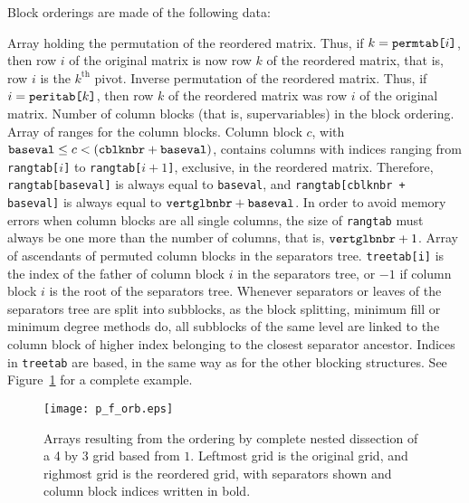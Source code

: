 Block orderings are made of the following data:
\begin{itemize}
\iteme[{\tt permtab}]
Array holding the permutation of the reordered matrix. Thus, if $k =
\mbox{\tt permtab}\mbox{\tt [}i\mbox{\tt ]}$, then row $i$ of the
original matrix is now row $k$ of the reordered matrix, that is, row
$i$ is the $k^{\mbox{th}}$ pivot.
\iteme[{\tt peritab}]
Inverse permutation of the reordered matrix. Thus, if $i = \mbox{\tt
peritab[$k$]}$, then row $k$ of the reordered matrix was row $i$ of
the original matrix.
\iteme[{\tt cblknbr}]
Number of column blocks (that is, supervariables) in the block ordering.
\iteme[{\tt rangtab}]
Array of ranges for the column blocks. Column block $c$, with
$\mbox{\tt baseval} \leq c < (\mbox{\tt cblknbr} + \mbox{\tt
baseval})$, contains columns with indices ranging from {\tt
rangtab[$i$]} to {\tt rangtab[$i + 1$]}, exclusive, in the reordered
matrix. Therefore,
{\tt rangtab[baseval]} is always equal to {\tt baseval}, and
{\tt rangtab[cblknbr + baseval]} is always equal to
$\mbox{\tt vert\lbt glb\lbt nbr} + \mbox{\tt baseval}$.
In order to avoid memory errors when column blocks are all single
columns, the size of {\tt rangtab} must always be one more than the
number of columns, that is, $\mbox{\tt vert\lbt glb\lbt nbr} + 1$.
\iteme[{\tt treetab}]
Array of ascendants of permuted column blocks in the separators tree.
{\tt treetab[i]} is the index of the father of column block $i$ in the
separators tree, or $-1$ if column block $i$ is the root of the
separators tree. Whenever separators or leaves of the separators tree
are split into subblocks, as the block splitting, minimum fill or minimum
degree methods do, all subblocks of the same level are linked to the
column block of higher index belonging to the closest separator
ancestor. Indices in {\tt treetab} are based, in the same way as for
the other blocking structures. See Figure~\ref{fig-lib-ord-block} for
a complete example.
\end{itemize}

\begin{figure}
\centering\texttt{[image: p\_f\_orb.eps]}
\caption{Arrays resulting from the ordering by complete nested
dissection of a 4 by 3 grid based from $1$. Leftmost grid is the
original grid, and righmost grid is the reordered grid, with
separators shown and column block indices written in bold.}
\label{fig-lib-ord-block}
\end{figure}

